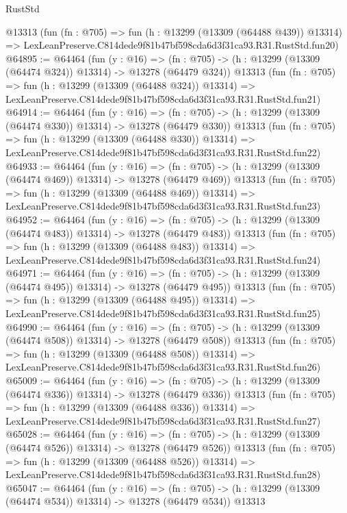 \begin{lexlean}{RustStd}
\begin{coremodule}
    @13313
    (fun (fn : @705) =>
    fun (h : @13299 (@13309 (@64488 @439)) @13314) =>
    LexLeanPreserve.C814dede9f81b47bf598cda6d3f31ca93.R31.RustStd.fun20)
@64895 := @64464
    (fun (y : @16) =>
    (fn : @705) -> (h : @13299 (@13309 (@64474 @324)) @13314) -> @13278 (@64479 @324))
    @13313
    (fun (fn : @705) =>
    fun (h : @13299 (@13309 (@64488 @324)) @13314) =>
    LexLeanPreserve.C814dede9f81b47bf598cda6d3f31ca93.R31.RustStd.fun21)
@64914 := @64464
    (fun (y : @16) =>
    (fn : @705) -> (h : @13299 (@13309 (@64474 @330)) @13314) -> @13278 (@64479 @330))
    @13313
    (fun (fn : @705) =>
    fun (h : @13299 (@13309 (@64488 @330)) @13314) =>
    LexLeanPreserve.C814dede9f81b47bf598cda6d3f31ca93.R31.RustStd.fun22)
@64933 := @64464
    (fun (y : @16) =>
    (fn : @705) -> (h : @13299 (@13309 (@64474 @469)) @13314) -> @13278 (@64479 @469))
    @13313
    (fun (fn : @705) =>
    fun (h : @13299 (@13309 (@64488 @469)) @13314) =>
    LexLeanPreserve.C814dede9f81b47bf598cda6d3f31ca93.R31.RustStd.fun23)
@64952 := @64464
    (fun (y : @16) =>
    (fn : @705) -> (h : @13299 (@13309 (@64474 @483)) @13314) -> @13278 (@64479 @483))
    @13313
    (fun (fn : @705) =>
    fun (h : @13299 (@13309 (@64488 @483)) @13314) =>
    LexLeanPreserve.C814dede9f81b47bf598cda6d3f31ca93.R31.RustStd.fun24)
@64971 := @64464
    (fun (y : @16) =>
    (fn : @705) -> (h : @13299 (@13309 (@64474 @495)) @13314) -> @13278 (@64479 @495))
    @13313
    (fun (fn : @705) =>
    fun (h : @13299 (@13309 (@64488 @495)) @13314) =>
    LexLeanPreserve.C814dede9f81b47bf598cda6d3f31ca93.R31.RustStd.fun25)
@64990 := @64464
    (fun (y : @16) =>
    (fn : @705) -> (h : @13299 (@13309 (@64474 @508)) @13314) -> @13278 (@64479 @508))
    @13313
    (fun (fn : @705) =>
    fun (h : @13299 (@13309 (@64488 @508)) @13314) =>
    LexLeanPreserve.C814dede9f81b47bf598cda6d3f31ca93.R31.RustStd.fun26)
@65009 := @64464
    (fun (y : @16) =>
    (fn : @705) -> (h : @13299 (@13309 (@64474 @336)) @13314) -> @13278 (@64479 @336))
    @13313
    (fun (fn : @705) =>
    fun (h : @13299 (@13309 (@64488 @336)) @13314) =>
    LexLeanPreserve.C814dede9f81b47bf598cda6d3f31ca93.R31.RustStd.fun27)
@65028 := @64464
    (fun (y : @16) =>
    (fn : @705) -> (h : @13299 (@13309 (@64474 @526)) @13314) -> @13278 (@64479 @526))
    @13313
    (fun (fn : @705) =>
    fun (h : @13299 (@13309 (@64488 @526)) @13314) =>
    LexLeanPreserve.C814dede9f81b47bf598cda6d3f31ca93.R31.RustStd.fun28)
@65047 := @64464
    (fun (y : @16) =>
    (fn : @705) -> (h : @13299 (@13309 (@64474 @534)) @13314) -> @13278 (@64479 @534))
    @13313

\end{coremodule}
\end{lexlean}

